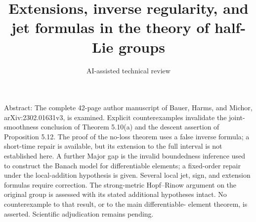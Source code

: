 \documentclass[10pt]{article}
\title{Extensions, inverse regularity, and jet formulas in the theory of half-Lie groups}
\author{AI-assisted technical review}
\date{}
\begin{document}
\maketitle
Abstract: The complete 42-page author manuscript of Bauer, Harms, and Michor, arXiv:2302.01631v3, is examined. Explicit counterexamples invalidate the joint-smoothness conclusion of Theorem 5.10(a) and the descent assertion of Proposition 5.12. The proof of the no-loss theorem uses a false inverse formula; a short-time repair is available, but its extension to the full interval is not established here. A further Major gap is the invalid boundedness inference used to construct the Banach model for differentiable elements; a fixed-order repair under the local-addition hypothesis is given. Several local jet, sign, and extension formulas require correction. The strong-metric Hopf–Rinow argument on the original group is assessed with its stated additional hypotheses intact. No counterexample to that result, or to the main differentiable- element theorem, is asserted. Scientific adjudication remains pending.\par
\end{document}

